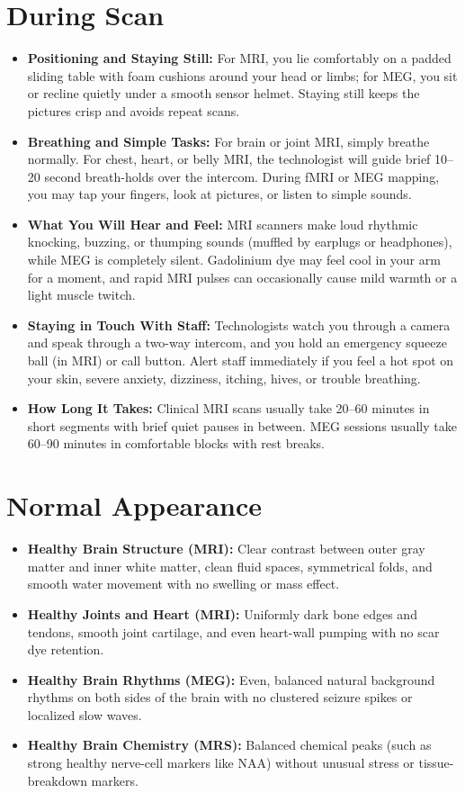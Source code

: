 \section{During Scan}
\begin{itemize}
  \item \textbf{Positioning and Staying Still:} For MRI, you lie comfortably on a padded sliding table with foam cushions around your head or limbs; for MEG, you sit or recline quietly under a smooth sensor helmet. Staying still keeps the pictures crisp and avoids repeat scans.
  \item \textbf{Breathing and Simple Tasks:} For brain or joint MRI, simply breathe normally. For chest, heart, or belly MRI, the technologist will guide brief 10--20 second breath-holds over the intercom. During fMRI or MEG mapping, you may tap your fingers, look at pictures, or listen to simple sounds.
  \item \textbf{What You Will Hear and Feel:} MRI scanners make loud rhythmic knocking, buzzing, or thumping sounds (muffled by earplugs or headphones), while MEG is completely silent. Gadolinium dye may feel cool in your arm for a moment, and rapid MRI pulses can occasionally cause mild warmth or a light muscle twitch.
  \item \textbf{Staying in Touch With Staff:} Technologists watch you through a camera and speak through a two-way intercom, and you hold an emergency squeeze ball (in MRI) or call button. Alert staff immediately if you feel a hot spot on your skin, severe anxiety, dizziness, itching, hives, or trouble breathing.
  \item \textbf{How Long It Takes:} Clinical MRI scans usually take 20--60 minutes in short segments with brief quiet pauses in between. MEG sessions usually take 60--90 minutes in comfortable blocks with rest breaks.
\end{itemize}

\section{Normal Appearance}
\begin{itemize}
  \item \textbf{Healthy Brain Structure (MRI):} Clear contrast between outer gray matter and inner white matter, clean fluid spaces, symmetrical folds, and smooth water movement with no swelling or mass effect.
  \item \textbf{Healthy Joints and Heart (MRI):} Uniformly dark bone edges and tendons, smooth joint cartilage, and even heart-wall pumping with no scar dye retention.
  \item \textbf{Healthy Brain Rhythms (MEG):} Even, balanced natural background rhythms on both sides of the brain with no clustered seizure spikes or localized slow waves.
  \item \textbf{Healthy Brain Chemistry (MRS):} Balanced chemical peaks (such as strong healthy nerve-cell markers like NAA) without unusual stress or tissue-breakdown markers.
\end{itemize}

